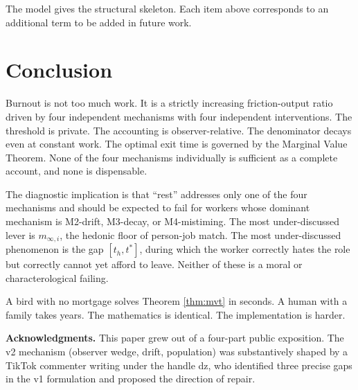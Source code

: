 \documentclass[11pt]{article}
\begin{document}
The model gives the structural skeleton. Each item above corresponds to an
additional term to be added in future work.

\section{Conclusion}

Burnout is not too much work. It is a strictly increasing friction-output
ratio driven by four independent mechanisms with four independent
interventions. The threshold is private. The accounting is observer-relative.
The denominator decays even at constant work. The optimal exit time is
governed by the Marginal Value Theorem. None of the four mechanisms
individually is sufficient as a complete account, and none is dispensable.

The diagnostic implication is that ``rest'' addresses only one of the four
mechanisms and should be expected to fail for workers whose dominant
mechanism is M2-drift, M3-decay, or M4-mistiming. The most under-discussed
lever is $m_{\infty,i}$, the hedonic floor of person-job match. The most
under-discussed phenomenon is the gap $[t_h, t^*]$, during which the worker
correctly hates the role but correctly cannot yet afford to leave. Neither
of these is a moral or characterological failing.

A bird with no mortgage solves Theorem \ref{thm:mvt} in seconds. A human
with a family takes years. The mathematics is identical. The implementation
is harder.

\bigskip\noindent\textbf{Acknowledgments.} This paper grew out of a four-part
public exposition. The v2 mechanism (observer wedge, drift, population) was
substantively shaped by a TikTok commenter writing under the handle dz, who
identified three precise gaps in the v1 formulation and proposed the
direction of repair.
\end{document}
